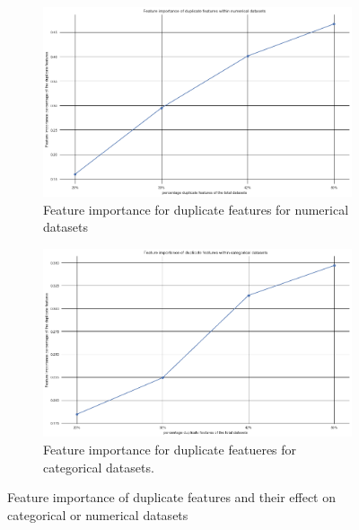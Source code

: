 \documentclass[a4paper,10pt]{article}
\begin{document}
\begin{figure}[H]
	\centering
	\begin{subfigure}[b]{0.45\textwidth}
		\includegraphics[width=\textwidth]{images/MetaFeatures/FeatureImportanceNum.png}
		\caption{Feature importance for duplicate features for numerical datasets}
		\label{fig:FIDN}
	\end{subfigure}
	\begin{subfigure}[b]{0.45\textwidth}
		\includegraphics[width=\textwidth]{images/MetaFeatures/FeatureImportanceCat.png}
		\caption{Feature importance for duplicate featueres for categorical datasets.}
		\label{fig:FIDC}
	\end{subfigure}
	\caption{Feature importance of duplicate features and their effect on categorical or numerical datasets}\label{fig:FID}
\end{figure}
\end{document}
